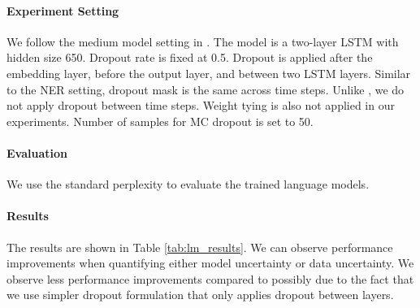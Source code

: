 \documentclass[letterpaper]{article} %
\begin{document}
\paragraph{Experiment Setting} We follow the medium model setting in \cite{zaremba2014recurrent}. The model is a two-layer LSTM with hidden size 650. Dropout rate is fixed at 0.5. Dropout is applied after the embedding layer, before the output layer, and between two LSTM layers. Similar to the NER setting, dropout mask is the same across time steps. Unlike \cite{gal2016theoretically}, we do not apply dropout between time steps. Weight tying is also not applied in our experiments. Number of samples for MC dropout is set to 50.

\paragraph{Evaluation} We use the standard perplexity to evaluate the trained language models.

\paragraph{Results} The results are shown in Table \ref{tab:lm_results}. We can observe performance improvements when quantifying either model uncertainty or data uncertainty. We observe less performance improvements  compared to \cite{gal2016theoretically} possibly due to the fact that we use simpler dropout formulation that only applies dropout between layers. 
\end{document}
